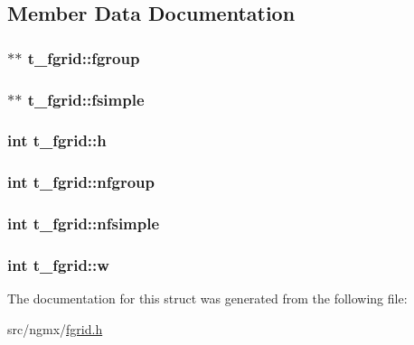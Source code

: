 \subsection{\-Member \-Data \-Documentation}
\hypertarget{structt__fgrid_a16e3153be2eff0a6f6e66c7cbfd2c59b}{
\subsubsection[{fgroup}]{$\ast$$\ast$ {\bf t\-\_\-fgrid\-::fgroup}}}\label{structt__fgrid_a16e3153be2eff0a6f6e66c7cbfd2c59b}
\hypertarget{structt__fgrid_a9b69f5d9cdac65e29a8d10e03c26a571}{
\subsubsection[{fsimple}]{$\ast$$\ast$ {\bf t\-\_\-fgrid\-::fsimple}}}\label{structt__fgrid_a9b69f5d9cdac65e29a8d10e03c26a571}
\hypertarget{structt__fgrid_a196df2c8d7817eda38fa5a3f454f6131}{
\subsubsection[{h}]{\setlength{\rightskip}{0pt plus 5cm}int {\bf t\-\_\-fgrid\-::h}}}\label{structt__fgrid_a196df2c8d7817eda38fa5a3f454f6131}
\hypertarget{structt__fgrid_ab766b0d0dba32b1cabc4bb737f1487f7}{
\subsubsection[{nfgroup}]{\setlength{\rightskip}{0pt plus 5cm}int {\bf t\-\_\-fgrid\-::nfgroup}}}\label{structt__fgrid_ab766b0d0dba32b1cabc4bb737f1487f7}
\hypertarget{structt__fgrid_a1797c5072c8d7a91f2c96dcbe23eb854}{
\subsubsection[{nfsimple}]{\setlength{\rightskip}{0pt plus 5cm}int {\bf t\-\_\-fgrid\-::nfsimple}}}\label{structt__fgrid_a1797c5072c8d7a91f2c96dcbe23eb854}
\hypertarget{structt__fgrid_a00f9201832611c840e4edf8b1c2315fa}{
\subsubsection[{w}]{\setlength{\rightskip}{0pt plus 5cm}int {\bf t\-\_\-fgrid\-::w}}}\label{structt__fgrid_a00f9201832611c840e4edf8b1c2315fa}


\-The documentation for this struct was generated from the following file\-:\begin{DoxyCompactItemize}
\item 
src/ngmx/\hyperlink{fgrid_8h}{fgrid.\-h}\end{DoxyCompactItemize}
